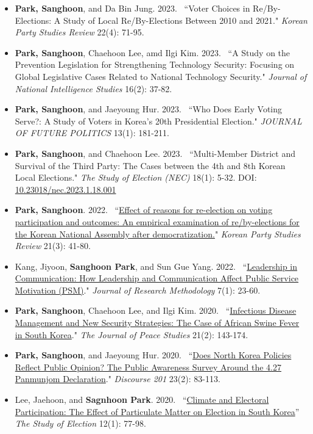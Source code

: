 \documentclass[
  16,
]{article}
\begin{document}
\begin{itemize}
    \item[13.] \textbf{Park, Sanghoon}, and Da Bin Jung. 2023. ~``Voter Choices in Re/By-Elections: A Study of Local Re/By-Elections Between 2010 and 2021." \textit{Korean Party Studies Review} 22(4): 71-95.
    \item[12.] \textbf{Park, Sanghoon}, Chaehoon Lee, amd Ilgi Kim. 2023. ~``A Study on the Prevention Legislation for Strengthening Technology Security: Focusing on Global Legislative Cases Related to National Technology Security." \textit{Journal of National Intelligence Studies} 16(2): 37-82.
    \item[11.] \textbf{Park, Sanghoon}, and Jaeyoung Hur. 2023. ~``Who Does Early Voting Serve?: A Study of Voters in Korea’s 20th Presidential Election." \textit{JOURNAL OF FUTURE POLITICS} 13(1): 181-211.
    \item[10.] \textbf{Park, Sanghoon}, and Chaehoon Lee. 2023. ~``Multi-Member District and Survival of the Third Party: The Cases between the 4th and 8th Korean Local Elections." \textit{The Study of Election (NEC)} 18(1): 5-32. DOI: \href{https://doi.org/10.23018/nec.2023.1.18.001}{10.23018/nec.2023.1.18.001}
    \item[9.] \textbf{Park, Sanghoon}. 2022. ~``\href{http://www.partystudies.or.kr/contents/bbs/bbs_list.html?bbs_cls_cd=004003}{Effect of reasons for re-election on voting participation and outcomes: An empirical examination of re/by-elections for the Korean National Assembly after democratization.}"  \textit{Korean Party Studies Review} 21(3): 41-80.
\item[8.] Kang, Jiyoon, \textbf{Sanghoon Park}, and Sun Gue Yang. 2022. ~``\href{http://basicdata.kr/board/read/journals/146/}{Leadership in Communication:
How Leadership and Communication Affect Public Service Motivation (PSM)}." \textit{Journal of Research Methodology} 7(1): 23-60.
\item[7.] \textbf{Park, Sanghoon}, Chaehoon Lee, and Ilgi Kim. 2020. ~``\href{https://www.earticle.net/Journal/Issues/511/28448}{Infectious Disease Management and New Security Strategies: The Case of African Swine Fever in South Korea}." \textit{The Journal of Peace Studies} 21(2): 143-174.
\item[6.] \textbf{Park, Sanghoon}, and Jaeyoung Hur. 2020. ~``\href{http://www.discourse201.org/html/sub05_01.asp}{Does North Korea Policies Reflect Public Opinion? The Public Awareness Survey Around the 4.27 Panmunjom Declaration}." \textit{Discourse 201} 23(2): 83-113.
\item[5.] Lee, Jaehoon, and \textbf{Sagnhoon Park}. 2020. ~``\href{https://m.nec.go.kr/portal/cmm/fms/FileDown.do?atchFileId=5d0ffae936edc42f3b4e864801f86a0f4096c44da03fede418b94067e8f9d0ea&fileSn=1&bbsId=&searchYear=}{Climate and Electoral Participation: The Effect of Particulate Matter on Election in South Korea}'' \textit{The Study of Election} 12(1): 77-98.

\end{itemize}
\end{document}
